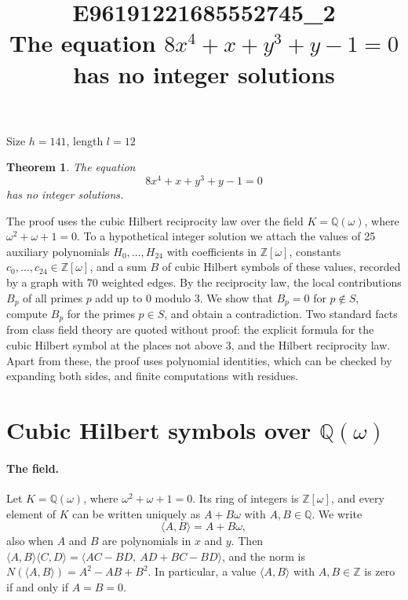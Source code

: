 \documentclass[11pt]{article}
\title{\textbf{E96191221685552745\_2}\\[4pt] {\Large The equation $8x^{4}+x+y^{3}+y-1=0$ has no integer solutions}}
\author{}
\date{}
\newtheorem{theorem}{Theorem}
\newcommand{\Z}{\mathbb{Z}}
\newcommand{\Q}{\mathbb{Q}}
\begin{document}
\maketitle
\vspace{-8ex}
\begin{center}
Size $h=141$, length $l=12$
\end{center}

\begin{theorem}\label{thm:main}
The equation
\begin{equation}\label{eq:main}
8x^{4}+x+y^{3}+y-1=0
\end{equation}
has no integer solutions.
\end{theorem}

The proof uses the cubic Hilbert reciprocity law over the field $K=\Q(\omega)$, where $\omega^2+\omega+1=0$. To a hypothetical integer solution we attach the values of 25 auxiliary polynomials $H_0,\dots,H_{24}$ with coefficients in $\Z[\omega]$, constants $c_0,\dots,c_{24}\in\Z[\omega]$, and a sum $B$ of cubic Hilbert symbols of these values, recorded by a graph with 70 weighted edges. By the reciprocity law, the local contributions $B_p$ of all primes $p$ add up to $0$ modulo $3$. We show that $B_p=0$ for $p\notin S$, compute $B_p$ for the primes $p\in S$, and obtain a contradiction. Two standard facts from class field theory are quoted without proof: the explicit formula for the cubic Hilbert symbol at the places not above $3$, and the Hilbert reciprocity law. Apart from these, the proof uses polynomial identities, which can be checked by expanding both sides, and finite computations with residues.


\section{\texorpdfstring{Cubic Hilbert symbols over $\Q(\omega)$}{Cubic Hilbert symbols over Q(w)}}\label{sec:symbols}

\paragraph{The field.} Let $K=\Q(\omega)$, where $\omega^2+\omega+1=0$. Its ring of integers is $\Z[\omega]$, and every element of $K$ can be written uniquely as $A+B\omega$ with $A,B\in\Q$. We write
\[
\langle A,B\rangle=A+B\omega,
\]
also when $A$ and $B$ are polynomials in $x$ and $y$. Then $\langle A,B\rangle\langle C,D\rangle=\langle AC-BD,\ AD+BC-BD\rangle$, and the norm is $N(\langle A,B\rangle)=A^2-AB+B^2$. In particular, a value $\langle A,B\rangle$ with $A,B\in\Z$ is zero if and only if $A=B=0$.
\end{document}
